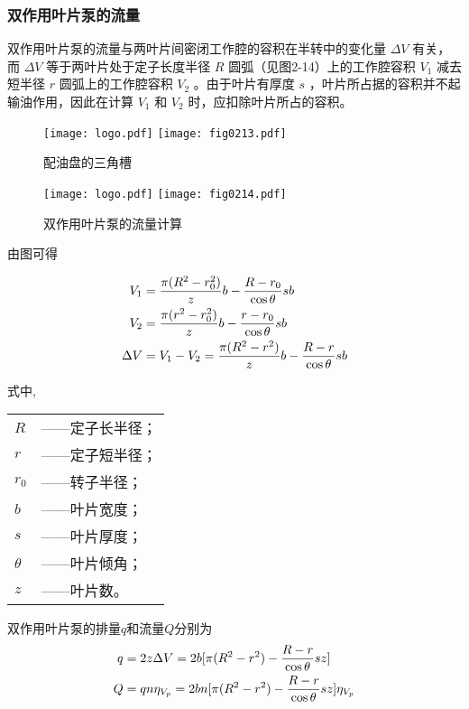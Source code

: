 \subsubsection{双作用叶片泵的流量}

双作用叶片泵的流量与两叶片间密闭工作腔的容积在半转中的变化量 $\Delta V$ 有关，而 $\Delta V$ 等于两叶片处于定子长度半径 $R$ 圆弧（见图2-14）上的工作腔容积 $V_{1}$ 减去短半径 $r$ 圆弧上的工作腔容积 $V_{2}$ 。由于叶片有厚度 $s$ ，叶片所占据的容积并不起输油作用，因此在计算 $V_{1}$ 和 $V_{2}$ 时，应扣除叶片所占的容积。


\begin{figure}[!hbt]
\centering
\ifOpenSource
\texttt{[image: logo.pdf]}
\else
\texttt{[image: fig0213.pdf]}
\fi
\caption{配油盘的三角槽}
\label{fig:fig0213}
\end{figure}


\begin{figure}[!hbt]
\centering
\ifOpenSource
\texttt{[image: logo.pdf]}
\else
\texttt{[image: fig0214.pdf]}
\fi
\caption{双作用叶片泵的流量计算}
\label{fig:fig0214}
\end{figure}



由图可得

\begin{align}
V_{1}&=\frac{\pi (R^{2}-r_{0}^{2})}{z} b- \frac{R-r_{0}}{\cos \theta} sb \notag \\
V_{2}&=\frac{\pi (r^{2}-r_{0}^{2})}{z} b- \frac{r-r_{0}}{\cos \theta} sb \notag \\
\Delta V&=V_{1}-V_{2}=\frac{\pi (R^{2}-r^{2})}{z} b- \frac{R-r}{\cos \theta} sb \notag
\end{align}

\noindent 式中, 
\begin{tabular}[t]{ll}
 $R$ & ——定子长半径； \\
 $r$ & ——定子短半径； \\
 $r_{0}$ & ——转子半径； \\
 $b$ & ——叶片宽度； \\
 $s$ & ——叶片厚度； \\
 $\theta$ & ——叶片倾角；\\
 $z$ & ——叶片数。
\end{tabular}

双作用叶片泵的排量$q$和流量$Q$分别为
\begin{align}
q&=2z\Delta V=2b[\pi (R^{2}-r^{2})-\frac{R-r}{\cos \theta}sz] \notag \\
Q&=qn\eta _{V_{p}}=2bn[\pi(R^{2}-r^{2})-\frac{R-r}{\cos \theta}sz]\eta _{V_{p}}
\end{align}

